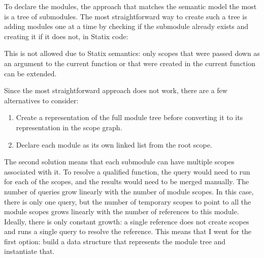 To declare the modules, the approach that matches the semantic model the most is a tree of submodules.
The most straightforward way to create such a tree is adding modules one at a time by checking if the submodule already exists and creating it if it does not, in Statix code:

  
This is not allowed due to Statix semantics: only scopes that were passed down as an argument to the current function or that were created in the current function can be extended.

Since the most straightforward approach does not work, there are a few alternatives to consider:
\begin{enumerate}
  \item Create a representation of the full module tree before converting it to its representation in the scope graph.
  \item Declare each module as its own linked list from the root scope.
\end{enumerate}

The second solution means that each submodule can have multiple scopes associated with it.
To resolve a qualified function, the query would need to run for each of the scopes, and the results would need to be merged manually.
The number of queries grow linearly with the number of module scopes.
In this case, there is only one query, but the number of temporary scopes to point to all the module scopes grows linearly with the number of references to this module.
Ideally, there is only constant growth: a single reference does not create scopes and runs a single query to resolve the reference.
This means that I went for the first option: build a data structure that represents the module tree and instantiate that.


